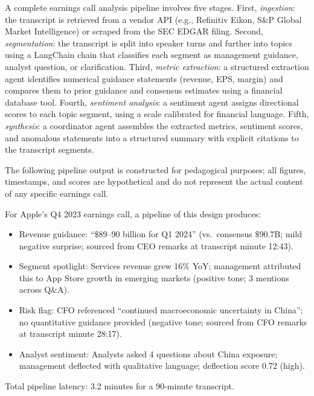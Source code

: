 \begin{context}
A complete earnings call analysis pipeline involves five stages. First, \emph{ingestion}:
the transcript is retrieved from a vendor API (e.g., Refinitiv Eikon, S\&P Global
Market Intelligence) or scraped from the SEC EDGAR filing. Second, \emph{segmentation}:
the transcript is split into speaker turns and further into topics using a LangChain
chain that classifies each segment as management guidance, analyst question, or
clarification. Third, \emph{metric extraction}: a structured extraction agent identifies
numerical guidance statements (revenue, EPS, margin) and compares them to prior guidance
and consensus estimates using a financial database tool. Fourth, \emph{sentiment analysis}:
a sentiment agent assigns directional scores to each topic segment, using a scale
calibrated for financial language. Fifth, \emph{synthesis}: a coordinator agent assembles
the extracted metrics, sentiment scores, and anomalous statements into a structured
summary with explicit citations to the transcript segments.

\begin{remark}
The following pipeline output is constructed for pedagogical purposes; all figures, timestamps, and scores are hypothetical and do not represent the actual content of any specific earnings call.
\end{remark}

\begin{example}
\label{ex:earnings-output}
For Apple's Q4 2023 earnings call, a pipeline of this design produces:
\begin{itemize}
  \item Revenue guidance: ``$\$$89--90 billion for Q1 2024'' (vs.\ consensus $\$$90.7B;
        mild negative surprise; sourced from CEO remarks at transcript minute 12:43).
  \item Segment spotlight: Services revenue grew 16\% YoY; management attributed this
        to App Store growth in emerging markets (positive tone; 3 mentions across Q\&A).
  \item Risk flag: CFO referenced ``continued macroeconomic uncertainty in China'';
        no quantitative guidance provided (negative tone; sourced from CFO remarks
        at transcript minute 28:17).
  \item Analyst sentiment: Analysts asked 4 questions about China exposure; management
        deflected with qualitative language; deflection score 0.72 (high).
\end{itemize}
Total pipeline latency: 3.2 minutes for a 90-minute transcript.
\end{example}


\end{context}
